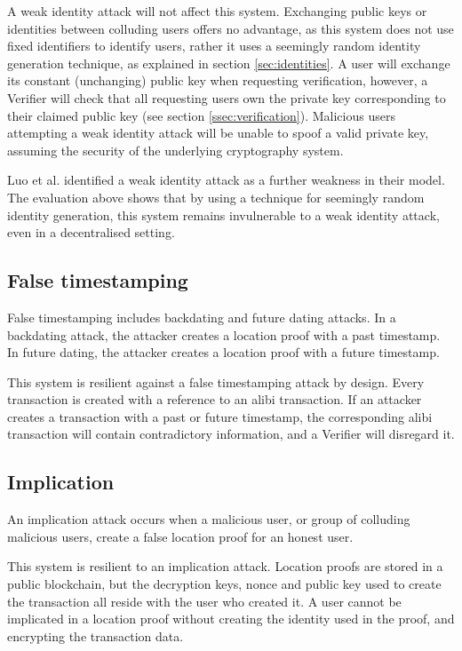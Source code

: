 A weak identity attack will not affect this system. Exchanging public keys or identities between colluding users offers no advantage, as this system does not use fixed identifiers to identify users, rather it uses a seemingly random identity generation technique, as explained in section \ref{sec:identities}. A user will exchange its constant (unchanging) public key when requesting verification, however, a Verifier will check that all requesting users own the private key corresponding to their claimed public key (see section \ref{ssec:verification}). Malicious users attempting a weak identity attack will be unable to spoof a valid private key, assuming the security of the underlying cryptography system.

Luo et al. \cite{luo} identified a weak identity attack as a further weakness in their model. The evaluation above shows that by using a technique for seemingly random identity generation, this system remains invulnerable to a weak identity attack, even in a decentralised setting.

\subsection{False timestamping}
False timestamping includes backdating and future dating attacks. In a backdating attack, the attacker creates a location proof with a past timestamp. In future dating, the attacker creates a location proof with a future timestamp.

This system is resilient against a false timestamping attack by design. Every transaction is created with a reference to an alibi transaction. If an attacker creates a transaction with a past or future timestamp, the corresponding alibi transaction will contain contradictory information, and a Verifier will disregard it.

\subsection{Implication}
An implication attack occurs when a malicious user, or group of colluding malicious users, create a false location proof for an honest user.

This system is resilient to an implication attack. Location proofs are stored in a public blockchain, but the decryption keys, nonce and public key used to create the transaction all reside with the user who created it. A user cannot be implicated in a location proof without creating the identity used in the proof, and encrypting the transaction data.

